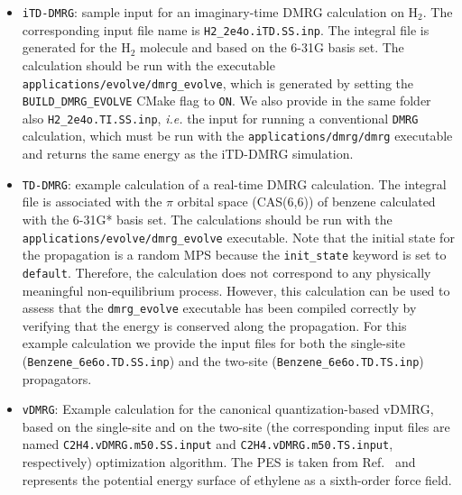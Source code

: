 \documentclass[bibliography=totoc,12pt,a4paper]{scrartcl}
\begin{document}
\begin{itemize}
 \item \texttt{iTD-DMRG}: sample input for an imaginary-time DMRG calculation on H$_2$.
 The corresponding input file name is \texttt{H2\_2e4o.iTD.SS.inp}.
 The integral file is generated for the H$_2$ molecule and based on the 6-31G basis set.
 The calculation should be run with the executable \texttt{applications/evolve/dmrg\_evolve}, which is generated by setting the \texttt{BUILD\_DMRG\_EVOLVE} CMake flag to \texttt{ON}.
 We also provide in the same folder also \texttt{H2\_2e4o.TI.SS.inp}, \textit{i.e.} the input for running a conventional \texttt{DMRG} calculation, which must be run with the \texttt{applications/dmrg/dmrg} executable and returns the same energy as the iTD-DMRG simulation.
 \item \texttt{TD-DMRG}: example calculation of a real-time DMRG calculation.
 The integral file is associated with the $\pi$ orbital space (CAS(6,6)) of benzene calculated with the 6-31G* basis set.
 The calculations should be run with the \texttt{applications/evolve/dmrg\_evolve} executable.
 Note that the initial state for the propagation is a random MPS because the \texttt{init\_state} keyword is set to \texttt{default}.
 Therefore, the calculation does not correspond to any physically meaningful non-equilibrium process. 
 However, this calculation can be used to assess that the \texttt{dmrg\_evolve} executable has been compiled correctly by verifying that the energy is conserved along the propagation.
 For this example calculation we provide the input files for both the single-site (\texttt{Benzene\_6e6o.TD.SS.inp}) and the two-site (\texttt{Benzene\_6e6o.TD.TS.inp}) propagators.
 \item \texttt{vDMRG}: 
 Example calculation for the canonical quantization-based vDMRG, based on the single-site and on the two-site (the corresponding input files are named \texttt{C2H4.vDMRG.m50.SS.input} and \texttt{C2H4.vDMRG.m50.TS.input}, respectively) optimization algorithm.
 The PES is taken from Ref.~ and represents the potential energy surface of ethylene as a sixth-order force field.

\end{itemize}
\end{document}
